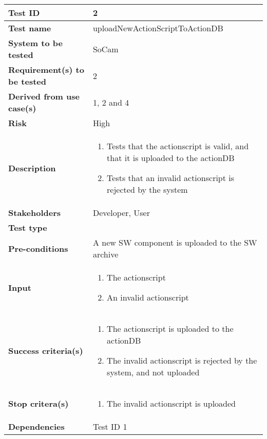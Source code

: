 		\begin{table}[H]
			\begin{tabular}{| p{4cm} | p{10cm} |}
			\hline
			\rowcolor{gray}
				{\bf Test ID} & 2 \\ \hline
				{\bf Test name} & uploadNewActionScriptToActionDB \\ \hline
				{\bf System to be tested} & SoCam\\ \hline
				{\bf Requirement(s) to be tested} & 2 \\ \hline
				{\bf Derived from use case(s)} & 1, 2 and 4\\ \hline
				{\bf Risk} & High \\ \hline
				{\bf Description} & 
					\begin{enumerate}
						\item Tests that the actionscript is valid, and that it is 
						uploaded to the actionDB
						\item Tests that an invalid actionscript is rejected by the system
					\end{enumerate}
				\\ \hline
				{\bf Stakeholders} & Developer, User \\ \hline
				{\bf Test type} & \\ \hline
				{\bf Pre-conditions} & A new SW component is uploaded to the SW archive \\ \hline
				{\bf Input} & 
					\begin{enumerate}
						\item The actionscript
						\item An invalid actionscript
					\end{enumerate}
				\\ \hline
				{\bf Success criteria(s)} & 
					\begin{enumerate}
						\item The actionscript is uploaded to the actionDB
						\item The invalid actionscript is rejected by the system, and not uploaded
					\end{enumerate}
				\\ \hline
				{\bf Stop critera(s)} &  
					\begin{enumerate}
						\item The invalid actionscript is uploaded
					\end{enumerate} \\ \hline
				{\bf Dependencies} & Test ID 1 \\ \hline
			\end{tabular}
		\end{table}


